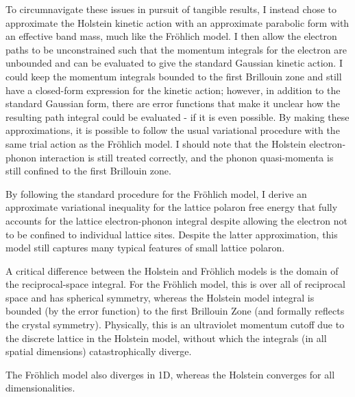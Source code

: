 To circumnavigate these issues in pursuit of tangible results, I instead chose to approximate the Holstein kinetic action with an approximate parabolic form with an effective band mass, much like the Fr\"ohlich model. I then allow the electron paths to be unconstrained such that the momentum integrals for the electron are unbounded and can be evaluated to give the standard Gaussian kinetic action. I could keep the momentum integrals bounded to the first Brillouin zone and still have a closed-form expression for the kinetic action; however, in addition to the standard Gaussian form, there are error functions that make it unclear how the resulting path integral could be evaluated - if it is even possible. By making these approximations, it is possible to follow the usual variational procedure with the same trial action as the Fr\"ohlich model. I should note that the Holstein electron-phonon interaction is still treated correctly, and the phonon quasi-momenta is still confined to the first Brillouin zone. 

By following the standard procedure for the Fr\"ohlich model, I derive an approximate variational inequality for the lattice polaron free energy that fully accounts for the lattice electron-phonon integral despite allowing the electron not to be confined to individual lattice sites. Despite the latter approximation, this model still captures many typical features of small lattice polaron.

A critical difference between the Holstein and Fr\"ohlich models is the domain of the reciprocal-space integral.  For the Fr\"ohlich model, this is over all of reciprocal space and has spherical symmetry, whereas the Holstein model integral is bounded (by the error function) to the first Brillouin Zone (and formally reflects the crystal symmetry). Physically, this is an ultraviolet momentum cutoff due to the discrete lattice in the Holstein model, without which the integrals (in all spatial dimensions) catastrophically diverge. 

The Fr\"ohlich model also diverges in 1D, whereas the Holstein converges for all dimensionalities.


